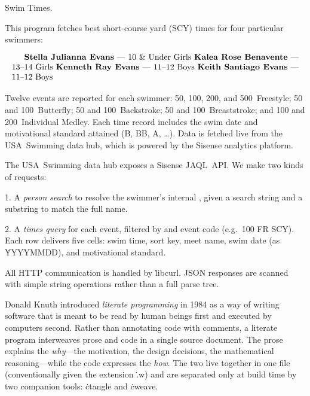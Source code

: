 

Swim Times.

This program fetches best short-course yard (SCY) times for four particular
swimmers:

\medskip
$${\vbox{
{\bf Stella Julianna Evans} --- 10~\&~Under Girls

{\bf Kalea Rose Benavente} --- 13--14 Girls

{\bf Kenneth Ray Evans} --- 11--12 Boys

{\bf Keith Santiago Evans} --- 11--12 Boys
}}$$

\medskip\noindent
Twelve events are reported for each swimmer:
50, 100, 200, and 500~Freestyle; 50 and 100~Butterfly;
50 and 100~Backstroke; 50 and 100~Breaststroke; and 100 and 200~Individual
Medley.  Each time record includes the swim date and motivational standard
attained (B, BB, A, \dots).  Data is fetched live from the USA~Swimming
data hub, which is powered by the Sisense analytics platform.

\fi

  The USA~Swimming data hub exposes a Sisense
JAQL~API.  We make two kinds of requests:

\medskip\item{1.} A {\it person search\/} to resolve the swimmer's internal
, given a search string and a substring to match the full
name.

\item{2.} A {\it times query\/} for each event, filtered by 
and event code (e.g.\ \.{100 FR SCY}).  Each row delivers five cells:
swim time, sort key, meet name, swim date (as \.{YYYYMMDD}), and
motivational standard.
\medskip

All HTTP communication is handled by \.{libcurl}.  JSON responses are
scanned with simple string operations rather than a full parse tree.

\fi

Donald Knuth introduced {\it literate programming\/} in 1984 as a way of
writing software that is meant to be read by human beings first and executed
by computers second.  Rather than annotating code with comments, a literate
program interweaves prose and code in a single source document.  The prose
explains the {\it why\/}---the motivation, the design decisions, the
mathematical reasoning---while the code expresses the {\it how}.  The two
live together in one file (conventionally given the extension \.{.w}) and
are separated only at build time by two companion tools: \.{ctangle} and
\.{cweave}.

